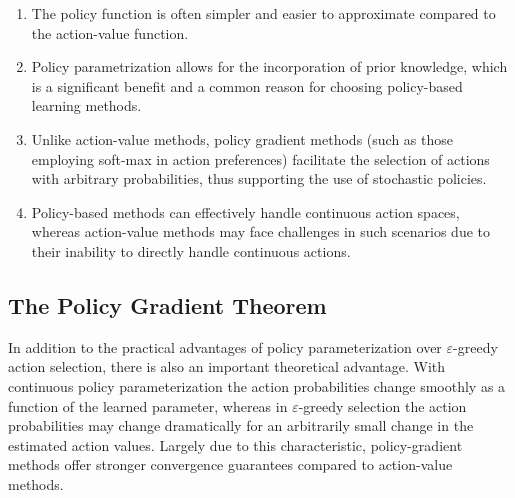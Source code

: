 {\begin{enumerate}
\item The policy function is often simpler and easier to approximate compared to the action-value function.
\item Policy parametrization allows for the incorporation of prior knowledge, which is a significant benefit and a common reason for choosing policy-based learning methods.
\item Unlike action-value methods, policy gradient methods (such as those employing soft-max in action preferences) facilitate the selection of actions with arbitrary probabilities, thus supporting the use of stochastic policies.
\item Policy-based methods can effectively handle continuous action spaces, whereas action-value methods may face challenges in such scenarios due to their inability to directly handle continuous actions.
\end{enumerate}

\subsection{The Policy Gradient Theorem}
In addition to the practical advantages of policy parameterization over $\varepsilon$-greedy action selection, there is also an important theoretical advantage. With continuous policy
parameterization the action probabilities change smoothly as a function of the learned
parameter, whereas in $\varepsilon$-greedy selection the action probabilities may change dramatically for an arbitrarily small change in the estimated action values.
Largely due to this characteristic, policy-gradient methods offer stronger convergence guarantees compared to action-value methods.\\

}
